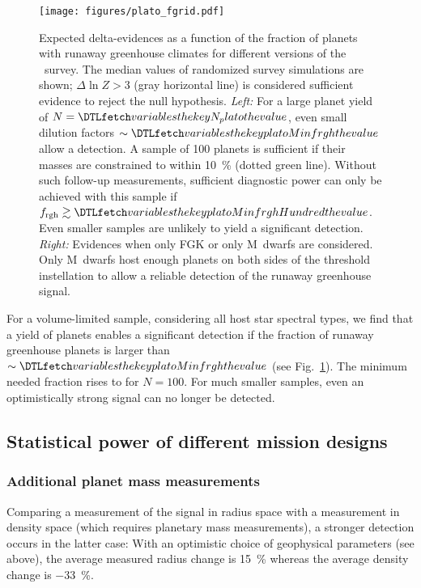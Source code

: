 \documentclass[twocolumn]{aastex631}
\begin{document}
    \begin{figure*}[ht!]
        \begin{centering}
            \texttt{[image: figures/plato\_fgrid.pdf]}
            \caption{
            Expected delta-evidences as a function of the fraction of planets with runaway greenhouse climates for different versions of the \plato\ survey.
            The median values of randomized survey simulations are shown; $\Delta \ln Z > 3$ (gray horizontal line) is considered sufficient evidence to reject the null hypothesis.
            \textit{Left:} For a large planet yield of $N = \var{N_plato}$, even small dilution factors $\sim \var{platoMinfrgh}$ allow a detection.
                A sample of 100 planets is sufficient if their masses are constrained to within \SI{10}{\percent} (dotted green line).
                Without such follow-up measurements, sufficient diagnostic power can only be achieved with this sample if $f_\mathrm{rgh} \gtrsim \var{platoMinfrghHundred}$.
               Even smaller samples are unlikely to yield a significant detection.
            \textit{Right:} Evidences when only FGK or only M~dwarfs are considered.
                Only M~dwarfs host enough planets on both sides of the threshold instellation to allow a reliable detection of the runaway greenhouse signal.
            }
            \label{fig:plato_fgrid}
        \end{centering}
    \end{figure*}

For a volume-limited sample, considering all host star spectral types, we find that a yield of  planets enables a significant detection if the fraction of runaway greenhouse planets is larger than $\sim \var{platoMinfrgh}$ (see Fig.~\ref{fig:plato_fgrid}).
The minimum needed fraction rises to  for $N = 100$.
For much smaller samples, even an optimistically strong signal can no longer be detected.


\subsection{Statistical power of different mission designs}\label{sec:statpower_missions}

\subsubsection{Additional planet mass measurements}\label{sec:res_followup}
Comparing a measurement of the signal in radius space with a measurement in density space (which requires planetary mass measurements), a stronger detection occurs in the latter case:
With an optimistic choice of geophysical parameters (see above), the average measured radius change is \SI{+15}{\percent} whereas the average density change is \SI{-33}{\percent}.
\end{document}
